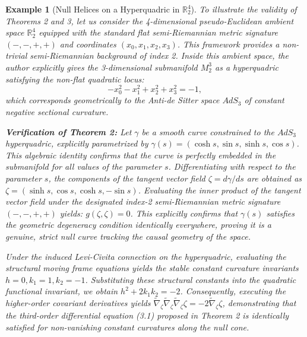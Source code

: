 \documentclass [reqno]{amsart}
\theoremstyle{plain}
\newtheorem{example}{Example}
\numberwithin{equation}{section}
\begin{document}
\begin{example}[Null Helices on a Hyperquadric in $\mathbb{R}_2^4$]
To illustrate the validity of Theorems 2 and 3, let us consider the 4-dimensional pseudo-Euclidean ambient space $\mathbb{R}_2^4$ equipped with the standard flat semi-Riemannian metric signature $(-,-,+,+)$ and coordinates $(x_0,x_1,x_2,x_3)$. This framework provides a non-trivial semi-Riemannian background of index 2. Inside this ambient space, the author explicitly gives the 3-dimensional submanifold $M_2^3$ as a hyperquadric satisfying the non-flat quadratic locus:
\begin{equation}
-x_0^2-x_1^2+x_2^2+x_3^2=-1,
\end{equation}
which corresponds geometrically to the Anti-de Sitter space $AdS_3$ of constant negative sectional curvature.

\noindent\textbf{Verification of Theorem 2:} Let $\gamma$ be a smooth curve constrained to the $AdS_3$ hyperquadric, explicitly parametrized by $\gamma(s)=(\cosh s, \sin s, \sinh s, \cos s)$. This algebraic identity confirms that the curve is perfectly embedded in the submanifold for all values of the parameter $s$. Differentiating with respect to the parameter $s$, the components of the tangent vector field $\zeta=d\gamma/ds$ are obtained as $\zeta=(\sinh s, \cos s, \cosh s, -\sin s)$. Evaluating the inner product of the tangent vector field under the designated index-2 semi-Riemannian metric signature $(-,-,+,+)$ yields: $g(\zeta,\zeta)=0$. This explicitly confirms that $\gamma(s)$ satisfies the geometric degeneracy condition identically everywhere, proving it is a genuine, strict null curve tracking the causal geometry of the space. 

Under the induced Levi-Civita connection on the hyperquadric, evaluating the structural moving frame equations yields the stable constant curvature invariants $h=0, k_1=1, k_2=-1$. Substituting these structural constants into the quadratic functional invariant, we obtain $h^2+2k_1 k_2=-2$. Consequently, executing the higher-order covariant derivatives yields $\tilde{\nabla}_\zeta \tilde{\nabla}_\zeta \tilde{\nabla}_\zeta \zeta=-2\tilde{\nabla}_\zeta \zeta$, demonstrating that the third-order differential equation (3.1) proposed in Theorem 2 is identically satisfied for non-vanishing constant curvatures along the null cone.
\end{example}
\end{document}
